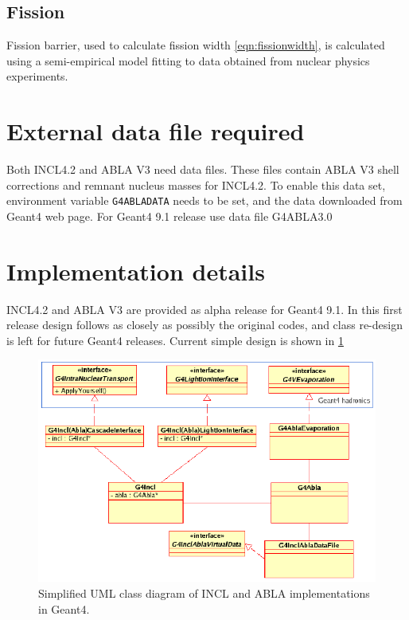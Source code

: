 
\subsection{Fission}

Fission barrier, used to calculate fission width
\ref{eqn:fissionwidth}, is calculated using a semi-empirical model
fitting to data obtained from nuclear physics experiments.


\section{External data file required}

Both INCL4.2 and ABLA V3 need data files. These files contain ABLA V3 shell corrections and remnant nucleus masses for INCL4.2. 
To enable this data set, environment variable {\tt G4ABLADATA} needs to be set, 
and the data downloaded from Geant4 web page. For Geant4 9.1 release use data file G4ABLA3.0

\section{Implementation details}
INCL4.2 and ABLA V3 are provided as alpha release for Geant4 9.1.
In this first release design follows as closely as possibly the original codes,
and class re-design is left for future Geant4 releases.
Current simple design is shown in  \ref{fig:uml}

\begin{figure}
\begin{center}
\includegraphics[angle=0,scale=1.0]{AblaUml.eps}
\end{center}
\caption[INCL4 and ABLA class diagram]{Simplified UML class diagram of
  INCL and ABLA implementations in Geant4.}
\label{fig:uml}
\end{figure}

